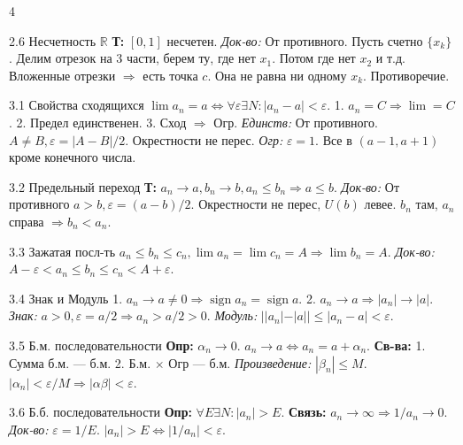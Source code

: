 \documentclass[8pt, a4paper, landscape]{extarticle}
\newcommand{\Ra}{\Rightarrow}
\newcommand{\R}{\mathbb{R}}
\newcommand{\eps}{\varepsilon}
\DeclareMathOperator{\sign}{sign}
\begin{document}
\begin{multicols*}{4}
\begin{ticket}{2.6 Несчетность $\R$}
\textbf{Т:} $[0, 1]$ несчетен.
\tcblower
\textit{Док-во:} От противного. Пусть счетно $\{x_k\}$.
Делим отрезок на 3 части, берем ту, где нет $x_1$.
Потом где нет $x_2$ и т.д.
Вложенные отрезки $\Ra$ есть точка $c$.
Она не равна ни одному $x_k$. Противоречие.
\end{ticket}


\begin{ticket}{3.1 Свойства сходящихся}
$\lim a_n = a \iff \forall \eps \exists N: |a_n-a|<\eps$.
1. $a_n=C \Ra \lim=C$. 2. Предел единственен. 3. Сход $\Ra$ Огр.
\tcblower
\textit{Единств:} От противного. $A \ne B, \eps=|A-B|/2$. Окрестности не перес.
\textit{Огр:} $\eps=1$. Все в $(a-1, a+1)$ кроме конечного числа.
\end{ticket}

\begin{ticket}{3.2 Предельный переход}
\textbf{Т:} $a_n \to a, b_n \to b, a_n \le b_n \Ra a \le b$.
\tcblower
\textit{Док-во:} От противного $a > b, \eps=(a-b)/2$.
Окрестности не перес, $U(b)$ левее. $b_n$ там, $a_n$ справа $\Ra b_n < a_n$.
\end{ticket}

\begin{ticket}{3.3 Зажатая посл-ть}
$a_n \le b_n \le c_n, \lim a_n = \lim c_n = A \Ra \lim b_n = A$.
\tcblower
\textit{Док-во:} $A-\eps < a_n \le b_n \le c_n < A+\eps$.
\end{ticket}

\begin{ticket}{3.4 Знак и Модуль}
1. $a_n \to a \ne 0 \Ra \sign a_n = \sign a$.
2. $a_n \to a \Ra |a_n| \to |a|$.
\tcblower
\textit{Знак:} $a > 0, \eps=a/2 \Ra a_n > a/2 > 0$.
\textit{Модуль:} $||a_n|-|a|| \le |a_n-a| < \eps$.
\end{ticket}

\begin{ticket}{3.5 Б.м. последовательности}
\textbf{Опр:} $\alpha_n \to 0$. $a_n \to a \iff a_n = a + \alpha_n$.
\textbf{Св-ва:} 1. Сумма б.м. — б.м. 2. Б.м. $\times$ Огр — б.м.
\tcblower
\textit{Произведение:} $|\beta_n| \le M$. $|\alpha_n| < \eps/M \Ra |\alpha\beta| < \eps$.
\end{ticket}

\begin{ticket}{3.6 Б.б. последовательности}
\textbf{Опр:} $\forall E \exists N: |a_n| > E$.
\textbf{Связь:} $a_n \to \infty \Ra 1/a_n \to 0$.
\tcblower
\textit{Док-во:} $\eps = 1/E$. $|a_n| > E \iff |1/a_n| < \eps$.
\end{ticket}


\end{multicols*}
\end{document}

